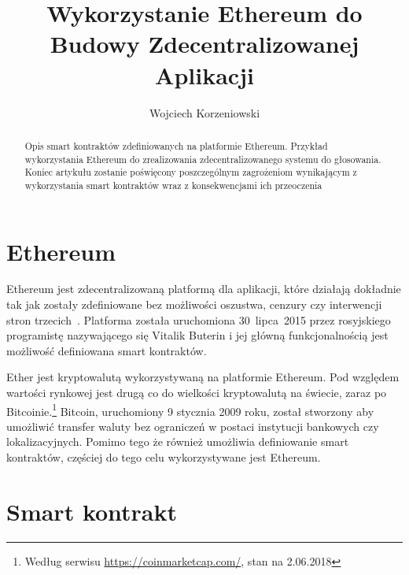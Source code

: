 \documentclass[]{llncs}
\renewcommand{\cite}[1]{~\oldcite{#1}}
\begin{document}
\title{Wykorzystanie Ethereum do Budowy Zdecentralizowanej Aplikacji}
\author{Wojciech Korzeniowski}

\maketitle

\begin{abstract}

  Opis smart kontraktów zdefiniowanych na platformie Ethereum. Przykład
  wykorzystania Ethereum do zrealizowania zdecentralizowanego systemu do
  głosowania. Koniec artykułu zostanie poświęcony poszczególnym zagrożeniom
  wynikającym z wykorzystania smart kontraktów wraz z konsekwencjami ich
  przeoczenia


\end{abstract}

\section{Ethereum}

  Ethereum jest zdecentralizowaną platformą dla aplikacji, które działają
  dokładnie tak jak zostały zdefiniowane bez możliwości oszustwa, cenzury czy
  interwencji stron trzecich\cite{ethereum}. Platforma została uruchomiona
  30~lipca~2015 przez rosyjskiego programistę nazywającego się Vitalik Buterin i
  jej główną funkcjonalnością jest możliwość definiowana smart kontraktów.

  Ether jest kryptowalutą wykorzystywaną na platformie Ethereum. Pod względem
  wartości rynkowej jest drugą co do wielkości kryptowalutą na świecie, zaraz po
  Bitcoinie.\footnote{Według serwisu \url{https://coinmarketcap.com/}, stan na
  2.06.2018} Bitcoin, uruchomiony 9 stycznia 2009 roku, został stworzony aby
  umożliwić transfer waluty bez ograniczeń w postaci instytucji bankowych czy
  lokalizacyjnych. Pomimo tego że również umożliwia definiowanie smart
  kontraktów, częściej do tego celu wykorzystywane jest Ethereum.

\section{Smart kontrakt}
\end{document}
